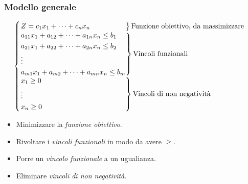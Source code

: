 \documentclass{article}
\begin{document}
\subsubsection{Modello generale}
$$
  \begin{cases}
    \begin{rcases}
      Z = c_1x_1 + \dots + c_nx_n \hspace{1.75cm}
    \end{rcases} \text{Funzione obiettivo, da massimizzare} \\
    \begin{rcases}
      a_{11}x_1 + a_{12}+\dots + a_{1n}x_n \le b_1 \\
      a_{21}x_1 + a_{22}+\dots + a_{2n}x_n \le b_2 \\
      \vdots                                       \\
      a_{m1}x_1 + a_{m2}+\dots + a_{mn}x_n \le b_m \\
    \end{rcases} \text{Vincoli funzionali}            \\
    \begin{rcases}
      x_1\ge0 \\
      \vdots  \\
      x_n \ge 0 \hspace{4.10cm}
    \end{rcases} \text{Vincoli di non negatività}
  \end{cases}
$$

\begin{tcolorbox}[
    colback=lightgray,
    colframe=black,
    coltext=black,
    title=Versioni alternative,
    colbacktitle=black,
    coltitle=lightgray,
    breakable
  ]
  \begin{itemize}
    \item Minimizzare la \textit{funzione obiettivo}.
    \item Rivoltare i \textit{vincoli funzionali} in modo da avere $\ge$.
    \item Porre un \textit{vincolo funzionale} a un ugualianza.
    \item Eliminare \textit{vincoli di non negatività}.
  \end{itemize}
\end{tcolorbox}
\end{document}
